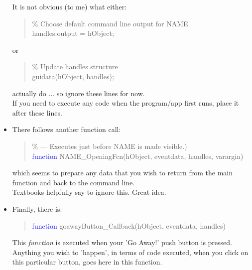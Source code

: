 \documentclass{tufte-book} %
\newenvironment{docspec}{\begin{quotation}\ttfamily\parskip0pt\parindent0pt\ignorespaces}{\end{quotation}}
\begin{document}
\begin{itemize}
It is not obvious (to me) what either:
\vspace{-2mm}
\begin{docspec}
\textcolor[rgb]{0,0.501961,0}{\% Choose default command line output for NAME}\\
handles.output = hObject;
\end{docspec}
\vspace{-1mm}
or
\vspace{-2mm}
\begin{docspec}
\textcolor[rgb]{0,0.501961,0}{\% Update handles structure}\\
guidata(hObject, handles);
\end{docspec}
\vspace{-1mm}
actually do ... so ignore these lines for now.
\\If you need to execute any code when the program/app first runs, place it after these lines.

\item There follows another function call:
\vspace{-1mm}
\begin{docspec}
\textcolor[rgb]{0,0.501961,0}{\% --- Executes just before NAME is made visible.)}\\
\textcolor{blue}{function} NAME\_OpeningFcn(hObject, eventdata, handles, varargin)
\end{docspec}
\vspace{-1mm}
which seems to prepare any data that you wish to return from the main function and back to the command line.
\\Textbooks helpfully say to ignore this. Great idea.

\item Finally, there is:
\vspace{-1mm}
\begin{docspec}
\textcolor{blue}{function} goawayButton\_Callback(hObject, eventdata, handles)
\end{docspec}
\vspace{-1mm}
This \textit{function} is executed when your 'Go Away!' push button is pressed.
Anything you wish to 'happen', in terms of code executed, when you click on this particular button, goes here in this function. 
\end{itemize}
\end{document}
